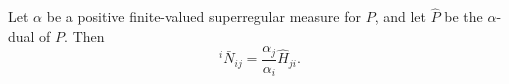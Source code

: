 Let $\alpha$ be a positive finite-valued superregular measure for $P$, and let $\hat{P}$ be the $\alpha$-dual of $P$. Then
$${}^i \bar{N}_{ij} = \frac{\alpha_j}{\alpha_i} \hat{H}_{ji}.$$
